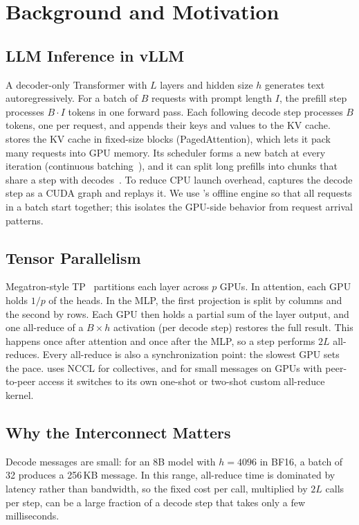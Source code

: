 \section{Background and Motivation}
\label{sec:background}

\subsection{LLM Inference in vLLM}
A decoder-only Transformer with $L$ layers and hidden size $h$ generates text
autoregressively.
For a batch of $B$ requests with prompt length $I$, the prefill step processes $B\cdot I$
tokens in one forward pass.
Each following decode step processes $B$ tokens, one per request, and appends their keys
and values to the KV cache.
\vllm~\cite{kwon2023pagedattention} stores the KV cache in fixed-size blocks
(PagedAttention), which lets it pack many requests into GPU memory.
Its scheduler forms a new batch at every iteration (continuous
batching~\cite{yu2022orca}), and it can split long prefills into chunks that share a step
with decodes~\cite{agrawal2024sarathi}.
To reduce CPU launch overhead, \vllm captures the decode step as a CUDA graph and replays
it.
We use \vllm's offline engine so that all requests in a batch start together; this
isolates the GPU-side behavior from request arrival patterns.

\subsection{Tensor Parallelism}
Megatron-style TP~\cite{shoeybi2019megatron,narayanan2021efficient} partitions each layer
across $p$ GPUs.
In attention, each GPU holds $1/p$ of the heads.
In the MLP, the first projection is split by columns and the second by rows.
Each GPU then holds a partial sum of the layer output, and one all-reduce of a $B\times h$
activation (per decode step) restores the full result.
This happens once after attention and once after the MLP, so a step performs $2L$
all-reduces.
Every all-reduce is also a synchronization point: the slowest GPU sets the pace.
\vllm uses NCCL for collectives, and for small messages on GPUs with peer-to-peer access it
switches to its own one-shot or two-shot custom all-reduce kernel.

\subsection{Why the Interconnect Matters}
Decode messages are small: for an 8B model with $h=4096$ in BF16, a batch of 32 produces a
256\,KB message.
In this range, all-reduce time is dominated by latency rather than bandwidth, so the
fixed cost per call, multiplied by $2L$ calls per step, can be a large fraction of a
decode step that takes only a few milliseconds.
